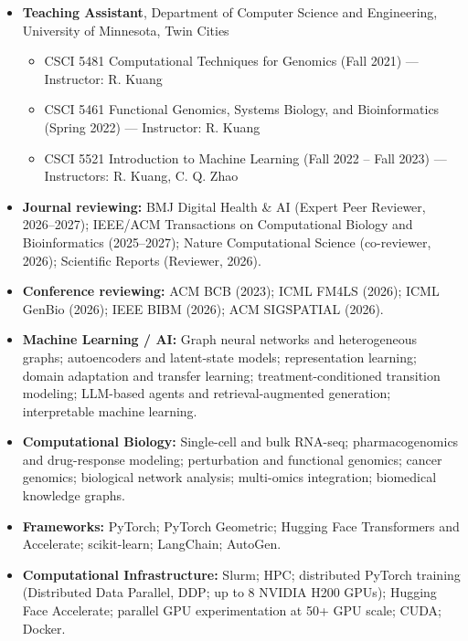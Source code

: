 \documentclass[11pt]{article}
\begin{document}
\begin{itemize}[leftmargin=*]
    \item[] \textbf{Teaching Assistant}, Department of Computer Science and Engineering, University of Minnesota, Twin Cities
    \begin{itemize}
        \item CSCI 5481 Computational Techniques for Genomics (Fall 2021) --- Instructor: R. Kuang
        \item CSCI 5461 Functional Genomics, Systems Biology, and Bioinformatics (Spring 2022) --- Instructor: R. Kuang
        \item CSCI 5521 Introduction to Machine Learning (Fall 2022 -- Fall 2023) --- Instructors: R. Kuang, C. Q. Zhao
    \end{itemize}
\end{itemize}


\begin{itemize}[leftmargin=*]
    \item[] \textbf{Journal reviewing:}
    BMJ Digital Health \& AI (Expert Peer Reviewer, 2026--2027);
    IEEE/ACM Transactions on Computational Biology and Bioinformatics (2025--2027);
    Nature Computational Science (co-reviewer, 2026);
    Scientific Reports (Reviewer, 2026).

    \item[] \textbf{Conference reviewing:}
    ACM BCB (2023); ICML FM4LS (2026); ICML GenBio (2026); IEEE BIBM (2026); ACM SIGSPATIAL (2026).
\end{itemize}

\begin{itemize}[leftmargin=*]
    \item[] \textbf{Machine Learning / AI:}
    Graph neural networks and heterogeneous graphs; autoencoders and latent-state models; representation learning; domain adaptation and transfer learning; treatment-conditioned transition modeling; LLM-based agents and retrieval-augmented generation; interpretable machine learning.

    \item[] \textbf{Computational Biology:}
    Single-cell and bulk RNA-seq; pharmacogenomics and drug-response modeling; perturbation and functional genomics; cancer genomics; biological network analysis; multi-omics integration; biomedical knowledge graphs.

    \item[] \textbf{Frameworks:}
    PyTorch; PyTorch Geometric; Hugging Face Transformers and Accelerate; scikit-learn; LangChain; AutoGen.

    \item[] \textbf{Computational Infrastructure:}
    Slurm; HPC; distributed PyTorch training (Distributed Data Parallel, DDP; up to 8 NVIDIA H200 GPUs); Hugging Face Accelerate; parallel GPU experimentation at 50+ GPU scale; CUDA; Docker.
\end{itemize}
\end{document}
